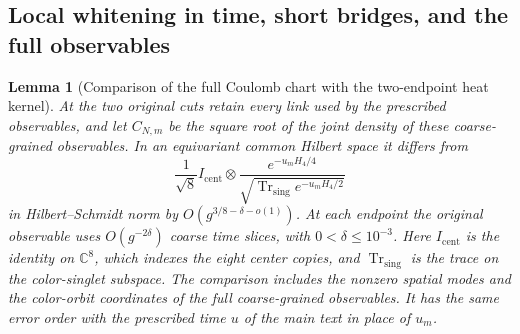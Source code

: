 \documentclass[11pt,a4paper]{article}
\newtheorem{lemma}[theorem]{Lemma}
\numberwithin{equation}{section}
\begin{document}
\subsection{Local whitening in time, short bridges, and the full observables}

\begin{lemma}[Comparison of the full Coulomb chart with the two-endpoint heat kernel]\label{lem:cam-soft-compare}
At the two original cuts retain every link used by the prescribed observables, and let \(C_{N,m}\) be the square root of the joint density of these coarse-grained observables. In an equivariant common Hilbert space it differs from
\[
 \frac1{\sqrt8}I_{\mathrm{cent}}\otimes
 \frac{e^{-u_mH_4/4}}{\sqrt{\operatorname{Tr}_{\mathrm{sing}}e^{-u_mH_4/2}}}
\]
in Hilbert--Schmidt norm by \(O(g^{3/8-\delta-o(1)})\). At each endpoint the original observable uses \(O(g^{-2\delta})\) coarse time slices, with \(0<\delta\le 10^{-3}\). Here \(I_{\mathrm{cent}}\) is the identity on \(\mathbb C^8\), which indexes the eight center copies, and \(\operatorname{Tr}_{\mathrm{sing}}\) is the trace on the color-singlet subspace. The comparison includes the nonzero spatial modes and the color-orbit coordinates of the full coarse-grained observables. It has the same error order with the prescribed time \(u\) of the main text in place of \(u_m\).
\end{lemma}
\end{document}

